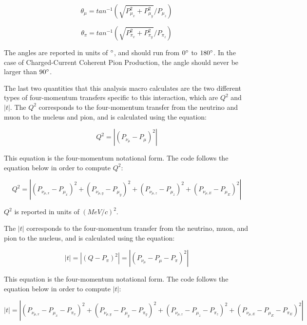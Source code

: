 \documentclass[11pt]{article}
\begin{document}
\begin{equation}
\theta_\mu = tan^{-1}(\sqrt{P_{\mu_x}^2 + P_{\mu_y}^2}/{P_{\mu_z}})
\end{equation}

\begin{equation}
\theta_\pi = tan^{-1}(\sqrt{P_{\pi_x}^2 + P_{\pi_y}^2}/{P_{\pi_z}})
\end{equation}

\noindent
The angles are reported in units of $\degree$, and should run from $0\degree$ to $180\degree$. In the case of Charged-Current Coherent Pion Production, the angle should never be larger than $90\degree$.

The last two quantities that this analysis macro calculates are the two different types of four-momentum transfers specific to this interaction, which are $Q^2$ and $|t|$. The $Q^2$ corresponds to the four-momentum transfer from the neutrino and muon to the nucleus and pion, and is calculated using the equation:

\begin{equation}
Q^2 = |(P_{\nu_\mu} - P_\mu)^2|
\end{equation}

\noindent
This equation is the four-momentum notational form. The code follows the equation below in order to compute $Q^2$:

\begin{equation}
Q^2 = |(P_{\nu_{\mu,x}} - P_{\mu_x})^2 + (P_{\nu_{\mu,y}} - P_{\mu_y})^2 + (P_{\nu_{\mu,z}} - P_{\mu_z})^2 + (P_{\nu_{\mu,E}} - P_{\mu_E})^2|
\end{equation}

\noindent
$Q^2$ is reported in units of $(MeV/c)^2$.

The $|t|$ corresponds to the four-momentum transfer from the neutrino, muon, and pion to the nucleus, and is calculated using the equation:

\begin{equation}
|t| = |(Q - P_\pi)^2| = |(P_{\nu_\mu} - P_\mu - P_\pi)^2|
\end{equation}

\noindent
This equation is the four-momentum notational form. The code follows the equation below in order to compute $|t|$:

\begin{equation}
|t| = |(P_{\nu_{\mu,x}} - P_{\mu_x} - P_{\pi_x})^2 + (P_{\nu_{\mu,y}} - P_{\mu_y} - P_{\pi_y})^2 + (P_{\nu_{\mu,z}} - P_{\mu_z} - P_{\pi_z})^2 + (P_{\nu_{\mu,E}} - P_{\mu_E} - P_{\pi_E})^2|
\end{equation}
\end{document}
